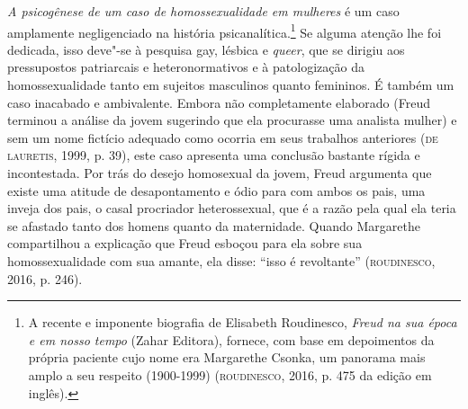 \emph{A psicogênese de um caso de homossexualidade em mulheres} é um
caso amplamente negligenciado na história psicanalítica.\footnote{A
  recente e imponente biografia de Elisabeth Roudinesco, \emph{Freud na
  sua época e em nosso tempo} (Zahar Editora), fornece, com base em
  depoimentos da própria paciente cujo nome era Margarethe Csonka, um
  panorama mais amplo a seu respeito (1900-1999) (\textsc{roudinesco}, 2016, p.
  475 da edição em inglês).} Se alguma atenção lhe foi dedicada, isso
deve"-se à pesquisa gay, lésbica e \emph{queer}, que se dirigiu aos
pressupostos patriarcais e heteronormativos e à patologização da
homossexualidade tanto em sujeitos masculinos quanto femininos. É também
um caso inacabado e ambivalente. Embora não completamente elaborado
(Freud terminou a análise da jovem sugerindo que ela procurasse uma
analista mulher) e sem um nome fictício adequado como ocorria em seus
trabalhos anteriores (\textsc{de lauretis}, 1999, p. 39), este caso apresenta uma
conclusão bastante rígida e incontestada. Por trás do desejo homosexual
da jovem, Freud argumenta que existe uma atitude de desapontamento e
ódio para com ambos os pais, uma inveja dos pais, o casal procriador
heterossexual, que é a razão pela qual ela teria se afastado tanto dos
homens quanto da maternidade. Quando Margarethe compartilhou a
explicação que Freud esboçou para ela sobre sua homossexualidade com sua
amante, ela disse: ``isso é revoltante'' (\textsc{roudinesco}, 2016, p. 246).

